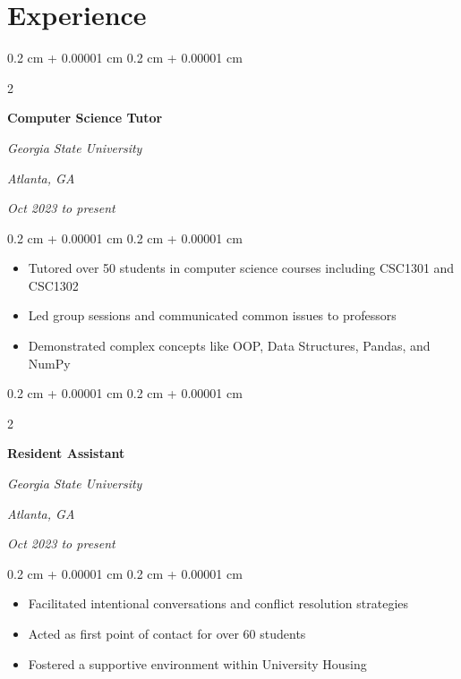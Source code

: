 \documentclass[12pt, letterpaper]{article}
\newenvironment{highlights}{
    \begin{itemize}[
        topsep=0.10 cm,
        parsep=0.10 cm,
        partopsep=0pt,
        itemsep=0pt,
        leftmargin=0.4 cm + 10pt
    ]
}{
    \end{itemize}
} %
\newenvironment{onecolentry}{
    \begin{adjustwidth}{
        0.2 cm + 0.00001 cm
    }{
        0.2 cm + 0.00001 cm
    }
}{
    \end{adjustwidth}
} %
\newenvironment{twocolentry}[2][]{
    \onecolentry
    \def\secondColumn{#2}
    \setcolumnwidth{\fill, 4.5 cm}
    \begin{paracol}{2}
}{
    \switchcolumn \raggedleft \secondColumn
    \end{paracol}
    \endonecolentry
} %
\begin{document}
    
    \section{Experience}



        
        \begin{twocolentry}{
        \textit{Atlanta, GA}

        \textit{Oct 2023 to present}}
            \textbf{Computer Science Tutor}

            \textit{Georgia State University}
        \end{twocolentry}

        \vspace{0.10 cm}
        \begin{onecolentry}
            \begin{highlights}
                \item Tutored over 50 students in computer science courses including CSC1301 and CSC1302
                \item Led group sessions and communicated common issues to professors
                \item Demonstrated complex concepts like OOP, Data Structures, Pandas, and NumPy
            \end{highlights}
        \end{onecolentry}


        \vspace{0.2 cm}

        \begin{twocolentry}{
        \textit{Atlanta, GA}

        \textit{Oct 2023 to present}}
            \textbf{Resident Assistant}

            \textit{Georgia State University}
        \end{twocolentry}

        \vspace{0.10 cm}
        \begin{onecolentry}
            \begin{highlights}
                \item Facilitated intentional conversations and conflict resolution strategies
                \item Acted as first point of contact for over 60 students
                \item Fostered a supportive environment within University Housing
            \end{highlights}
        \end{onecolentry}
\end{document}
